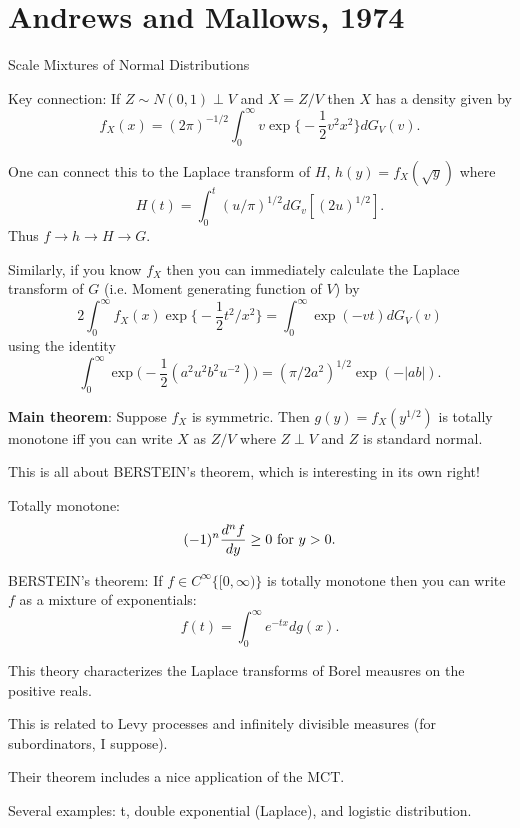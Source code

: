 \documentclass{article}
\begin{document}
\section{Andrews and Mallows, 1974}

Scale Mixtures of Normal Distributions

\begin{outline}

\1 Key connection:  If $Z \sim N(0,1) \perp V$ and $X = Z/V$ then $X$ has a
density given by
\begin{equation}
\label{am74:scale-mixture}
f_X(x) = (2 \pi)^{-1/2} \int_0^\infty v 
\exp \big\{ -\frac{1}{2} v^2 x^2 \big\} dG_V(v).
\end{equation}

\1 One can connect this to the Laplace transform of $H$, $h(y) = f_X(\sqrt{y})$
where
\[
H(t) = \int_0^t (u/\pi)^{1/2} dG_v[(2u)^{1/2}].
\]
Thus $f \rightarrow h \rightarrow H \rightarrow G$.

  \2 Similarly, if you know $f_X$ then you can immediately calculate the Laplace
  transform of $G$ (i.e. Moment generating function of $V$) by
  \[
  2 \int_0^\infty f_X(x) \exp \big\{ -\frac{1}{2} t^2 / x^2 \big\}
  =
  \int_0^\infty \exp (-vt) dG_V(v)
  \]
  using the identity
  \[
  \int_0^\infty \exp \Big( -\frac{1}{2} (a^2 u^2 b^2 u^{-2}) \Big)
  =
  (\pi/2a^2)^{1/2} \exp (-|ab|).
  \]

\1 \textbf{Main theorem}: Suppose $f_X$ is symmetric.  Then $g(y) =
f_X(y^{1/2})$ is totally monotone iff you can write $X$ as $Z/V$ where $Z \perp
V$ and $Z$ is standard normal.

  \2 This is all about BERSTEIN's theorem, which is interesting in its own
  right!

  \2 Totally monotone: 
  \[
  (-1)^n \frac{d^n f}{dy} \geq 0 \textmd{ for } y > 0.
  \]

  \2 BERSTEIN's theorem: If $f \in C^\infty\{ [0, \infty) \}$ is totally
  monotone then you can write $f$ as a mixture of exponentials:
  \[
  f(t) = \int_0^\infty e^{-tx} dg(x).
  \]

  \3 This theory characterizes the Laplace transforms of Borel meausres on the
  positive reals.

  \3 This is related to Levy processes and infinitely divisible measures (for
  subordinators, I suppose).

  \2 Their theorem includes a nice application of the MCT.

\1 Several examples: t, double exponential (Laplace), and logistic distribution.

\end{outline}
\end{document}
